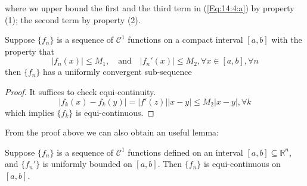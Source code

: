 where we upper bound the first and the third term in (\ref{Eq:14:4:a}) by property (1); the second term by property (2).
\begin{corollary}
Suppose $\{f_n\}$ is a sequence of $\mathcal{C}^1$ functions on a compact interval $[a,b]$ with the property that 
\[
|f_n(x)|\le M_1,\quad
\mbox{and}\quad |f_n'(x)|\le M_2,\forall x\in[a,b],\forall n
\]
then $\{f_n\}$ has a uniformly convergent sub-sequence
\end{corollary}
\begin{proof}
It suffices to check equi-continuity. 
\[
|f_k(x)-f_k(y)|=|f'(z)||x-y|
\le M_2|x-y|,\forall k
\]
which implies $\{f_k\}$ is equi-continuous.
\end{proof}
From the proof above we can also obtain an useful lemma:
\begin{corollary}\label{Cor:14:2}
Suppose $\{f_n\}$ is a sequence of $\mathcal{C}^1$ functions defined on an interval $[a,b]\subseteq\mathbb{R}^n$, and $\{f_n'\}$ is uniformly bounded on $[a,b]$. Then $\{f_n\}$ is equi-continuous on $[a,b]$. 
\end{corollary}

